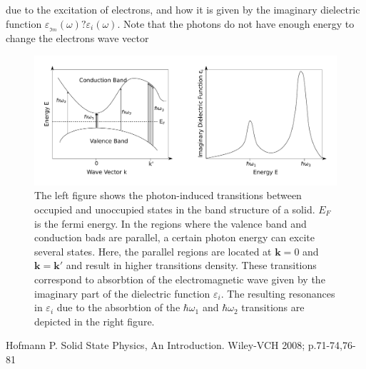 due to the excitation of electrons, and how it is given by the imaginary dielectric function 
$\varepsilon\!_{_{\Im\! m}} \!\! (\omega) ? \varepsilon_i(\omega)$. Note that the photons do not have
enough energy to change the electrons wave vector
%
\begin{figure}[h!]
  \centering
   \includegraphics[width=1.0\textwidth]{../Figures/bandstructureVSdielectric.pdf}
   \caption{
      The left figure shows the photon-induced transitions between occupied and unoccupied states in the band 
      structure of a solid. $E_F$ is the fermi energy. 
      In the regions where the valence band and conduction bads are parallel,
      a certain photon energy can excite several states. Here, the parallel regions are located at
      $\boldsymbol k = 0$ and $\boldsymbol k = \boldsymbol k'$ and result in higher transitions density.
      These transitions correspond to absorbtion of the electromagnetic wave given by the imaginary part of
      the dielectric function $\varepsilon_i$. The resulting resonances in $\varepsilon_i$ due to 
      the absorbtion of the $\hbar \omega_1$ and $\hbar \omega_2$ transitions are depicted in the right
      figure.
   }
   \label{fig:transitionResonance}
\end{figure}
%






\begin{thebibliography}{9}

         Hofmann P.
         Solid State Physics, An Introduction.
         Wiley-VCH 2008; p.71-74,76-81

\end{thebibliography}




